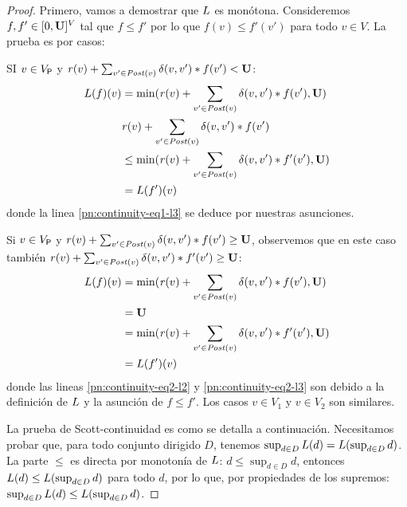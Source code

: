\iffalse
\begin{proof}
    
    Primero, vamos a demostrar que $L$ es monótona. Consideremos $f,f' \in [0,\mathbf{U}]^V$  tal que
$f \leq f'$ por lo que $f(v) \leq f'(v')$ para todo $v \in V$.  La prueba es por casos:

    SI $v \in V_{\mathsf{P}}$ y $\mathit{r}(v) + \sum_{v' \in \mathit{Post}(v)} \delta(v,v')* f(v') < \mathbf{U}$:
\begin{align}
    L(f)(v) & = \min (\mathit{r}(v) + \sum_{v' \in \mathit{Post}(v)} \delta(v,v')* f(v'), \mathbf{U})\label{pn:continuity-eq1-l1} \\
            & \mathit{r}(v) + \sum_{v' \in \mathit{Post}(v)} \delta(v,v')* f(v') \label{pn:continuity-eq1-l2} \\
           & \leq \min (\mathit{r}(v) + \sum_{v' \in \mathit{Post}(v)} \delta(v,v') * f'(v'), \mathbf{U})          \label{pn:continuity-eq1-l3} \\
           & = L(f')(v)  
\end{align}
    donde la linea \ref{pn:continuity-eq1-l3} se deduce por nuestras asunciones.
   
    Si $v \in V_{\mathsf{P}}$ y $\mathit{r}(v) + \sum_{v' \in \mathit{Post}(v)} \delta(v,v')* f(v') \geq \mathbf{U}$, observemos que en este caso también $\mathit{r}(v) + \sum_{v' \in \mathit{Post}(v)} \delta(v,v')* f'(v') \geq \mathbf{U}$:
\begin{align}
    L(f)(v) & = \min(\mathit{r}(v) + \sum_{v' \in \mathit{Post}(v)} \delta(v,v')* f(v'), \mathbf{U}) \label{pn:continuity-eq2-l1} \\
                            & = \mathbf{U}                                                                  \label{pn:continuity-eq2-l2} \\
                            & = \min( \mathit{r}(v) + \sum_{v' \in \mathit{Post}(v)} \delta(v,v') * f'(v'), \mathbf{U}) \label{pn:continuity-eq2-l3} \\
                            & = L(f')(v)   \label{pn:continuity-eq2-l4}
\end{align}
donde las lineas \ref{pn:continuity-eq2-l2} y  \ref{pn:continuity-eq2-l3} son debido a la definición de $L$ y la asunción de $f \leq f'$.
    Los casos $v \in V_1$ y $v \in V_2$ son similares.
    
    La prueba de Scott-continuidad es como se detalla a continuación. Necesitamos probar que, para todo conjunto dirigido $D$, tenemos $\sup_{d \in D} L(d) =  L(\sup_{d \in D} d)$.
    La parte $\leq$ es directa por monotonía de $L$: $d \leq \sup_{d \in D} d$, entonces $L(d) \leq L( \sup_{d \in D} d)$ para todo $d$,
    por lo que, por propiedades de los supremos: $\sup_{d \in D} L(d) \leq  L(\sup_{d \in D} d)$.
    

\end{proof}
